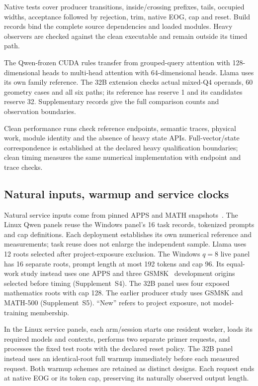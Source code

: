 Native tests cover producer transitions, inside/crossing prefixes, tails, occupied widths, acceptance followed by rejection, trim, native EOG, cap and reset. Build records bind the complete source dependencies and loaded modules. Heavy observers are checked against the clean executable and remain outside its timed path.

The Qwen-frozen CUDA rules transfer from grouped-query attention with 128-dimensional heads to multi-head attention with 64-dimensional heads. Llama uses its own family reference. The 32B extension checks actual mixed-Q4 operands, 60 geometry cases and all six paths; its reference has reserve 1 and its candidates reserve 32. Supplementary records give the full comparison counts and observation boundaries.

Clean performance runs check reference endpoints, semantic traces, physical work, module identity and the absence of heavy state APIs. Full-vector/state correspondence is established at the declared heavy qualification boundaries; clean timing measures the same numerical implementation with endpoint and trace checks.

\subsection{Natural inputs, warmup and service clocks}
Natural service inputs come from pinned APPS and MATH snapshots~\cite{apps,math}. The Linux Qwen panels reuse the Windows panel's 16 task records, tokenized prompts and cap definitions. Each deployment establishes its own numerical reference and measurements; task reuse does not enlarge the independent sample. Llama uses 12 roots selected after project-exposure exclusion. The Windows $q=8$ live panel has 16 separate roots, prompt length at most 192 tokens and cap 96. Its equal-work study instead uses one APPS and three GSM8K~\cite{gsm8k} development origins selected before timing (Supplement~S4). The 32B panel uses four exposed mathematics roots with cap 128. The earlier producer study uses GSM8K and MATH-500 (Supplement~S5). ``New'' refers to project exposure, not model-training membership.

In the Linux service panels, each arm/session starts one resident worker, loads its required models and contexts, performs two separate primer requests, and processes the fixed test roots with the declared reset policy. The 32B panel instead uses an identical-root full warmup immediately before each measured request. Both warmup schemes are retained as distinct designs. Each request ends at native EOG or its token cap, preserving its naturally observed output length.


